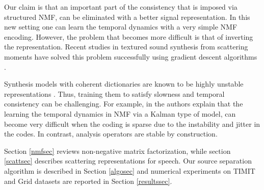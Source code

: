 
Our claim is that an important part of the consistency that is imposed via structured NMF, can be eliminated with a better signal representation.
In this new setting one can learn the temporal dynamics with a very simple NMF encoding. However, the problem that becomes
more difficult is that of inverting the representation. Recent studies in textured sound synthesis from scattering
moments have solved this problem successfully using gradient descent algorithms \cite{bruna2013audio}.

Synthesis models with coherent dictionaries are known to be highly unstable representations \cite{jenatton2012local}. 
Thus, training them to satisfy slowness and temporal consistency can be challenging. For example, in \cite{icassp13a}
the authors explain that the learning the temporal dynamics in NMF via a Kalman type of model, can become very difficult
when the coding is sparse due to the instability and jitter in the codes.
In contrast, analysis operators are stable by construction.

Section \ref{nmfsec} reviews non-negative matrix factorization, while section \ref{scattsec} describes scattering 
representations for speech. Our source separation algorithm is described in Section \ref{algosec} and 
numerical experiments on TIMIT and Grid datasets are reported in Section \ref{resultssec}.




